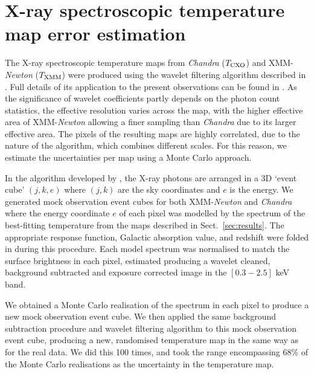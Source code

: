 \documentclass[twocolumn,traditabstract]{aa}
\def \TXC {T_{\rm CXO}}
\def \TXX {T_{\rm XMM}}
\begin{document}
\section{X-ray spectroscopic temperature map error estimation}\label{append:Txerror}
The X-ray spectroscopic temperature maps from \textit{Chandra} ($\TXC$) and XMM-\textit{Newton} ($\TXX$) were produced using the wavelet filtering algorithm described in \cite{Bourdin2008}. Full details of its application to the present observations can be found in \cite{Adam2016b}. As the significance of wavelet coefficients partly depends on the photon count statistics, the effective resolution varies across the map, with the higher effective area of XMM-\textit{Newton} allowing a finer sampling than \textit{Chandra} due to its larger effective area. The pixels of the resulting maps are highly correlated, due to the nature of the algorithm, which combines different scales. For this reason, we estimate the uncertainties per map using a Monte Carlo approach.

In the algorithm developed by \citet{Bourdin2008}, the X-ray photons are arranged in a 3D `event cube' $(j,k,e)$ where $(j,k)$ are the sky coordinates and $e$ is the energy. We generated mock observation event cubes for both XMM-{\it Newton} and {\it Chandra} where the energy coordinate $e$ of each pixel was modelled by the spectrum of the best-fitting temperature from the maps described in Sect.~\ref{sec:results}. The appropriate response function, Galactic absorption value, and redshift were folded in during this procedure. Each model spectrum was normalised to match the surface brightness in each pixel, estimated producing a wavelet cleaned, background subtracted and exposure corrected image in the $[0.3-2.5]$ keV band.

We obtained a Monte Carlo realisation of the spectrum in each pixel to produce a new mock observation event cube. We then applied the same background subtraction procedure and wavelet filtering algorithm to this mock observation event cube, producing a new, randomised temperature map in the same way as for the real data. We did this 100 times, and took the range encompassing 68\% of the Monte Carlo realisations as the uncertainty in the temperature map.

\end{document}
